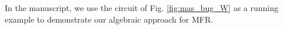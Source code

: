 In the manuscript, we use the circuit of Fig. \ref{fig:mas_bug_W} as a
running example to demonstrate our algebraic approach for MFR. 

